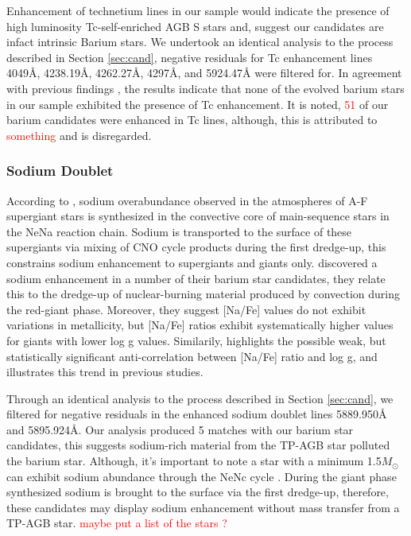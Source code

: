\documentclass[a4paper,fleqn,usenatbib]{mnras}
\newcommand{\todo}[1]{\textcolor{red}{#1}}
\begin{document}
Enhancement of technetium lines in our sample would indicate the presence of high luminosity Tc-self-enriched AGB S stars \citep{jorissen1993} and, suggest our candidates are infact intrinsic Barium stars. We undertook an identical analysis to the process described in Section \ref{sec:cand}, negative residuals for Tc enhancement lines 4049\AA, 4238.19\AA, 4262.27\AA, 4297\AA, and 5924.47\AA\hspace{0.2mm} were filtered for. In agreement with previous findings \citep[e.g.][]{little1987,smith1984,smith1983}, the results indicate that none of the evolved barium stars in our sample exhibited the presence of Tc enhancement. It is noted, \todo{51} of our barium candidates were enhanced in Tc lines, although, this is attributed to \todo{something} and is disregarded.


\subsubsection{Sodium Doublet}

According to \citet{el1995}, sodium overabundance observed in the atmospheres of A-F supergiant stars is synthesized in the convective core of main-sequence stars in the NeNa reaction chain. Sodium is transported to the surface of these supergiants via mixing of CNO cycle products during the first dredge-up, this constrains sodium enhancement to supergiants and giants only. \citet{antipova2004} discovered a sodium enhancement in a number of their barium star candidates, they relate this to the dredge-up of nuclear-burning material produced by convection during the red-giant phase. Moreover, they suggest [Na/Fe] values do not exhibit variations in metallicity, but [Na/Fe] ratios exhibit systematically higher values for giants with lower log g values. Similarily, \citet{decastro2016} highlights the possible weak, but statistically significant anti-correlation between [Na/Fe] ratio and log g, and illustrates this trend in previous studies\citep[e.g.][]{boyarchuk2002,mishenina2006,luck2007,takeda2008}. 

Through an identical analysis to the process described in Section \ref{sec:cand}, we filtered for negative residuals in the enhanced sodium doublet lines 5889.950\AA\hspace{0.2mm} and 5895.924\AA. Our analysis produced 5 matches with our barium star candidates, this suggests sodium-rich material from the TP-AGB star polluted the barium star. Although, it's important to note a star with a minimum 1.5$M_\odot$ can exhibit sodium abundance through the NeNc cycle \citep{denissenkov1987}. During the giant phase synthesized sodium is brought to the surface via the first dredge-up, therefore, these candidates may display sodium enhancement without mass transfer from a TP-AGB star.
\todo{maybe put a list of the stars ?}
\end{document}
